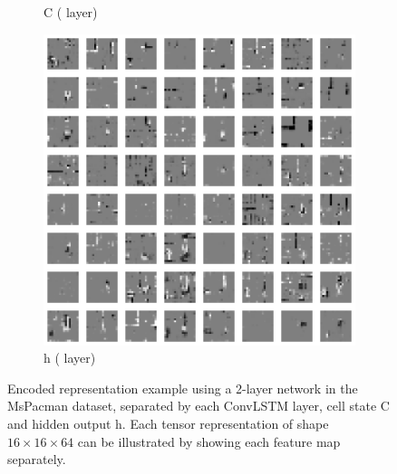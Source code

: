 \begin{figure}[h!tb]
\begin{subfigure}{0.24\textwidth}
  \caption{C \tiny{( layer)}}
  \label{fig:pac-lrep3}
  \vspace{.1cm}
\end{subfigure}
\begin{subfigure}{0.24\textwidth}
  \centering
  \includegraphics[width=0.92\linewidth]{figures/learned_rep/pac/2h.png}
  \caption{h \tiny{( layer)}}
  \label{fig:pac-lrep4}
  \vspace{.1cm}
\end{subfigure}
\caption[Encoded Representation in MsPacman]{Encoded representation example using a 2-layer network in the MsPacman dataset, separated by each ConvLSTM layer, cell state C and hidden output h. Each tensor representation of shape $16 \times 16 \times 64$ can be illustrated by showing each feature map separately.}
\label{fig:pac-lrep}
\end{figure}

